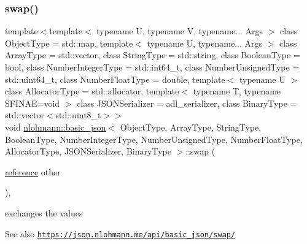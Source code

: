 \subsubsection{\texorpdfstring{swap()}{swap()}\hspace{0.1cm}{\footnotesize\ttfamily [1/6]}}
{\footnotesize\ttfamily template$<$template$<$ typename U, typename V, typename... Args $>$ class Object\+Type = std\+::map, template$<$ typename U, typename... Args $>$ class Array\+Type = std\+::vector, class String\+Type  = std\+::string, class Boolean\+Type  = bool, class Number\+Integer\+Type  = std\+::int64\+\_\+t, class Number\+Unsigned\+Type  = std\+::uint64\+\_\+t, class Number\+Float\+Type  = double, template$<$ typename U $>$ class Allocator\+Type = std\+::allocator, template$<$ typename T, typename S\+F\+I\+N\+A\+E=void $>$ class J\+S\+O\+N\+Serializer = adl\+\_\+serializer, class Binary\+Type  = std\+::vector$<$std\+::uint8\+\_\+t$>$$>$ \\
void \hyperlink{classnlohmann_1_1basic__json}{nlohmann\+::basic\+\_\+json}$<$ Object\+Type, Array\+Type, String\+Type, Boolean\+Type, Number\+Integer\+Type, Number\+Unsigned\+Type, Number\+Float\+Type, Allocator\+Type, J\+S\+O\+N\+Serializer, Binary\+Type $>$\+::swap (\begin{DoxyParamCaption}\item[{\hyperlink{classnlohmann_1_1basic__json_a220ae98554a76205fb7f8822d36b2d5a}{reference}}]{other }\end{DoxyParamCaption})\hspace{0.3cm}{\ttfamily [inline]}, {\ttfamily [noexcept]}}



exchanges the values 

\begin{DoxySeeAlso}{See also}
\href{https://json.nlohmann.me/api/basic_json/swap/}{\tt https\+://json.\+nlohmann.\+me/api/basic\+\_\+json/swap/} 
\end{DoxySeeAlso}
\mbox{\label{classnlohmann_1_1basic__json_a76126242de262f6d38cadda19e0d13e1}} 
